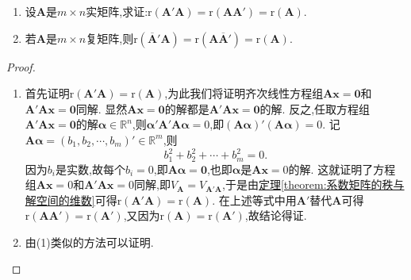 \documentclass[../../main.tex]{subfiles}%
\begin{document}
\begin{proposition}\label{proposition:AA转置秩与A秩相等}
\begin{enumerate}[(1)]
\item 设\(\boldsymbol{A}\)是\(m\times n\)实矩阵,求证:\(\mathrm{r}(\boldsymbol{A}'\boldsymbol{A})=\mathrm{r}(\boldsymbol{A}\boldsymbol{A}')=\mathrm{r}(\boldsymbol{A})\).

\item 若\(\boldsymbol{A}\)是\(m\times n\)复矩阵,则\(\mathrm{r}\left(\overline{\boldsymbol{A}}'\boldsymbol{A}\right)=\mathrm{r}\left(\boldsymbol{A}\overline{\boldsymbol{A}}'\right)=\mathrm{r}(\boldsymbol{A})\).
\end{enumerate}
\end{proposition}
\begin{proof}
\begin{enumerate}[(1)]
\item 首先证明\(\mathrm{r}(\boldsymbol{A}'\boldsymbol{A})=\mathrm{r}(\boldsymbol{A})\),为此我们将证明齐次线性方程组\(\boldsymbol{A}\boldsymbol{x}=\boldsymbol{0}\)和\(\boldsymbol{A}'\boldsymbol{A}\boldsymbol{x}=\boldsymbol{0}\)同解. 显然\(\boldsymbol{A}\boldsymbol{x}=\boldsymbol{0}\)的解都是\(\boldsymbol{A}'\boldsymbol{A}\boldsymbol{x}=\boldsymbol{0}\)的解. 反之,任取方程组\(\boldsymbol{A}'\boldsymbol{A}\boldsymbol{x}=\boldsymbol{0}\)的解\(\boldsymbol{\alpha}\in\mathbb{R}^n\),则\(\boldsymbol{\alpha}'\boldsymbol{A}'\boldsymbol{A}\boldsymbol{\alpha}=0\),即\((\boldsymbol{A}\boldsymbol{\alpha})'(\boldsymbol{A}\boldsymbol{\alpha}) = 0\). 记\(\boldsymbol{A}\boldsymbol{\alpha}=(b_1,b_2,\cdots,b_m)'\in\mathbb{R}^m\),则
\[
b_1^2 + b_2^2+\cdots + b_m^2 = 0.
\]
因为\(b_i\)是实数,故每个\(b_i = 0\),即\(\boldsymbol{A}\boldsymbol{\alpha}=\boldsymbol{0}\),也即\(\boldsymbol{\alpha}\)是\(\boldsymbol{A}\boldsymbol{x}=0\)的解. 这就证明了方程组\(\boldsymbol{A}\boldsymbol{x}=0\)和\(\boldsymbol{A}'\boldsymbol{A}\boldsymbol{x}=0\)同解,即\(V_{\boldsymbol{A}}=V_{\boldsymbol{A}'\boldsymbol{A}}\),于是由\hyperref[theorem:系数矩阵的秩与解空间的维数]{定理\ref{theorem:系数矩阵的秩与解空间的维数}}可得\(\mathrm{r}(\boldsymbol{A}'\boldsymbol{A})=\mathrm{r}(\boldsymbol{A})\). 在上述等式中用\(\boldsymbol{A}'\)替代\(\boldsymbol{A}\)可得\(\mathrm{r}(\boldsymbol{A}\boldsymbol{A}')=\mathrm{r}(\boldsymbol{A}')\),又因为\(\mathrm{r}(\boldsymbol{A})=\mathrm{r}(\boldsymbol{A}')\),故结论得证.

\item 由(1)类似的方法可以证明.
\end{enumerate}

\end{proof}
\end{document}
